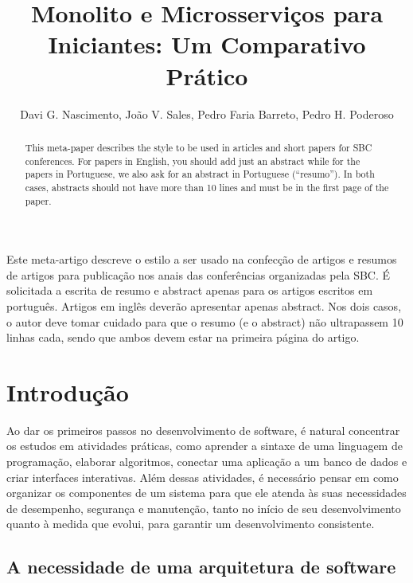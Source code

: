 \documentclass[12pt]{article}
\title{Monolito e Microsserviços para Iniciantes: Um Comparativo Prático}
\author{Davi G. Nascimento\inst{1}, João V. Sales\inst{1}, Pedro Faria Barreto\inst{1}, Pedro H. Poderoso\inst{1} }
\begin{document}
 

\maketitle

\begin{abstract}
  This meta-paper describes the style to be used in articles and short papers
  for SBC conferences. For papers in English, you should add just an abstract
  while for the papers in Portuguese, we also ask for an abstract in
  Portuguese (``resumo''). In both cases, abstracts should not have more than
  10 lines and must be in the first page of the paper.
\end{abstract}
     
\begin{resumo} 
  Este meta-artigo descreve o estilo a ser usado na confecção de artigos e
  resumos de artigos para publicação nos anais das conferências organizadas
  pela SBC. É solicitada a escrita de resumo e abstract apenas para os artigos
  escritos em português. Artigos em inglês deverão apresentar apenas abstract.
  Nos dois casos, o autor deve tomar cuidado para que o resumo (e o abstract)
  não ultrapassem 10 linhas cada, sendo que ambos devem estar na primeira
  página do artigo.
\end{resumo}


\section{Introdução}

Ao dar os primeiros passos no desenvolvimento de software, é natural concentrar os estudos em atividades práticas, como aprender a sintaxe de uma linguagem de programação, elaborar algoritmos, conectar uma aplicação a um banco de dados e criar interfaces interativas. Além dessas atividades, é necessário pensar em como organizar os componentes de um sistema para que ele atenda às suas necessidades de desempenho, segurança e manutenção, tanto no início de seu desenvolvimento quanto à medida que evolui, para garantir um desenvolvimento consistente.

\subsection{A necessidade de uma arquitetura de software}
\end{document}
